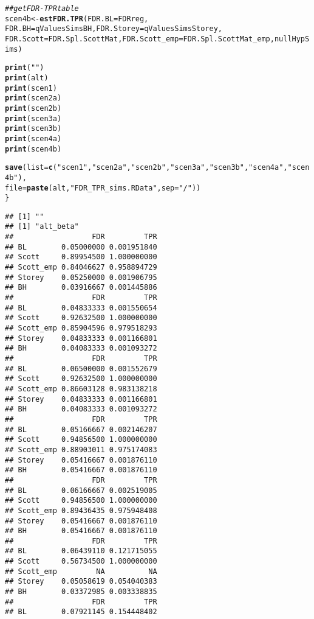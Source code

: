 \documentclass{article}\usepackage[]{graphicx}\usepackage[]{color}
\makeatletter
\newcommand{\hlstr}[1]{\textcolor[rgb]{0.192,0.494,0.8}{#1}}%
\newcommand{\hlcom}[1]{\textcolor[rgb]{0.678,0.584,0.686}{\textit{#1}}}%
\newcommand{\hlstd}[1]{\textcolor[rgb]{0.345,0.345,0.345}{#1}}%
\newcommand{\hlkwb}[1]{\textcolor[rgb]{0.69,0.353,0.396}{#1}}%
\newcommand{\hlkwc}[1]{\textcolor[rgb]{0.333,0.667,0.333}{#1}}%
\newcommand{\hlkwd}[1]{\textcolor[rgb]{0.737,0.353,0.396}{\textbf{#1}}}%
\newenvironment{kframe}{%
 \def\at@end@of@kframe{}%
 \ifinner\ifhmode%
  \def\at@end@of@kframe{\end{minipage}}%
  \begin{minipage}{\columnwidth}%
 \fi\fi%
 \def\FrameCommand##1{\hskip\@totalleftmargin \hskip-\fboxsep
 \colorbox{shadecolor}{##1}\hskip-\fboxsep
     \hskip-\linewidth \hskip-\@totalleftmargin \hskip\columnwidth}%
 \MakeFramed {\advance\hsize-\width
   \@totalleftmargin\z@ \linewidth\hsize
   \@setminipage}}%
 {\par\unskip\endMakeFramed%
 \at@end@of@kframe}
\newenvironment{knitrout}{}{} %
\makeatother
\begin{document}
\begin{knitrout}
\begin{kframe}
\begin{alltt}
  \hlcom{##get FDR-TPR table}
  \hlstd{scen4b} \hlkwb{<-} \hlkwd{estFDR.TPR}\hlstd{(}\hlkwc{FDR.BL} \hlstd{= FDRreg,}
                       \hlkwc{FDR.BH} \hlstd{= qValuesSimsBH,} \hlkwc{FDR.Storey} \hlstd{= qValuesSimsStorey,}
                       \hlkwc{FDR.Scott} \hlstd{= FDR.Spl.ScottMat,} \hlkwc{FDR.Scott_emp} \hlstd{= FDR.Spl.ScottMat_emp, nullHypSims)}

  \hlkwd{print}\hlstd{(}\hlstr{""}\hlstd{)}
  \hlkwd{print}\hlstd{(alt)}
  \hlkwd{print}\hlstd{(scen1)}
  \hlkwd{print}\hlstd{(scen2a)}
  \hlkwd{print}\hlstd{(scen2b)}
  \hlkwd{print}\hlstd{(scen3a)}
  \hlkwd{print}\hlstd{(scen3b)}
  \hlkwd{print}\hlstd{(scen4a)}
  \hlkwd{print}\hlstd{(scen4b)}

  \hlkwd{save}\hlstd{(}\hlkwc{list}\hlstd{=}\hlkwd{c}\hlstd{(}\hlstr{"scen1"}\hlstd{,}\hlstr{"scen2a"}\hlstd{,}\hlstr{"scen2b"}\hlstd{,}\hlstr{"scen3a"}\hlstd{,}\hlstr{"scen3b"}\hlstd{,}\hlstr{"scen4a"}\hlstd{,}\hlstr{"scen4b"}\hlstd{),}
       \hlkwc{file}\hlstd{=}\hlkwd{paste}\hlstd{(alt,}\hlstr{"FDR_TPR_sims.RData"}\hlstd{,}\hlkwc{sep}\hlstd{=}\hlstr{"/"}\hlstd{))}
\hlstd{\}}
\end{alltt}
\begin{verbatim}
## [1] ""
## [1] "alt_beta"
##                  FDR         TPR
## BL        0.05000000 0.001951840
## Scott     0.89954500 1.000000000
## Scott_emp 0.84046627 0.958894729
## Storey    0.05250000 0.001906795
## BH        0.03916667 0.001445886
##                  FDR         TPR
## BL        0.04833333 0.001550654
## Scott     0.92632500 1.000000000
## Scott_emp 0.85904596 0.979518293
## Storey    0.04833333 0.001166801
## BH        0.04083333 0.001093272
##                  FDR         TPR
## BL        0.06500000 0.001552679
## Scott     0.92632500 1.000000000
## Scott_emp 0.86603128 0.983138218
## Storey    0.04833333 0.001166801
## BH        0.04083333 0.001093272
##                  FDR         TPR
## BL        0.05166667 0.002146207
## Scott     0.94856500 1.000000000
## Scott_emp 0.88903011 0.975174083
## Storey    0.05416667 0.001876110
## BH        0.05416667 0.001876110
##                  FDR         TPR
## BL        0.06166667 0.002519005
## Scott     0.94856500 1.000000000
## Scott_emp 0.89436435 0.975948408
## Storey    0.05416667 0.001876110
## BH        0.05416667 0.001876110
##                  FDR         TPR
## BL        0.06439110 0.121715055
## Scott     0.56734500 1.000000000
## Scott_emp         NA          NA
## Storey    0.05058619 0.054040383
## BH        0.03372985 0.003338835
##                  FDR         TPR
## BL        0.07921145 0.154448402

\end{verbatim}
\end{kframe}
\end{knitrout}
\end{document}
